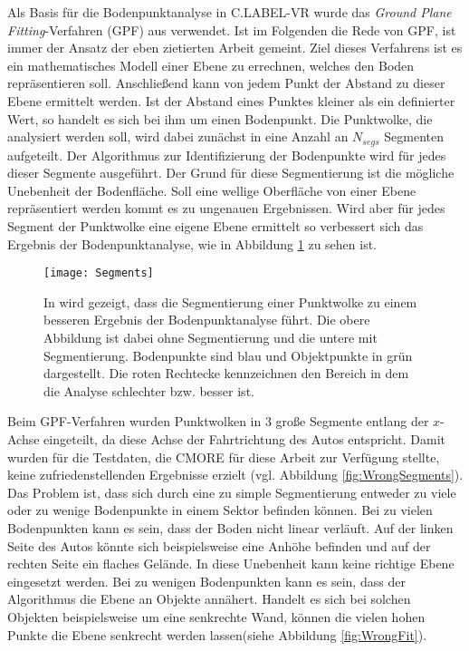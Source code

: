 Als Basis für die Bodenpunktanalyse in C.LABEL-VR wurde das \textit{Ground Plane Fitting}-Verfahren (GPF) aus \cite{bib:Segmentation1} verwendet. Ist im Folgenden die Rede von GPF, ist immer der Ansatz der eben zietierten Arbeit gemeint. Ziel dieses Verfahrens ist es ein mathematisches Modell einer Ebene zu errechnen, welches den Boden repräsentieren soll. Anschließend kann von jedem Punkt der Abstand zu dieser Ebene ermittelt werden. Ist der Abstand eines Punktes kleiner als ein definierter Wert, so handelt es sich bei ihm um einen Bodenpunkt. Die Punktwolke, die analysiert werden soll, wird dabei zunächst in eine Anzahl an $N_{segs}$ Segmenten aufgeteilt. Der Algorithmus zur Identifizierung der Bodenpunkte wird für jedes dieser Segmente ausgeführt. Der Grund für diese Segmentierung ist die mögliche Unebenheit der Bodenfläche. Soll eine wellige Oberfläche von einer Ebene repräsentiert werden kommt es zu ungenauen Ergebnissen. Wird aber für jedes Segment der Punktwolke eine eigene Ebene ermittelt so verbessert sich das Ergebnis der Bodenpunktanalyse, wie in Abbildung \ref{fig:Segments} zu sehen ist.\\

\begin{figure}%
	\centering
    \texttt{[image: Segments]}
    \caption{In \cite{bib:Segmentation1} wird gezeigt, dass die Segmentierung einer Punktwolke zu einem besseren Ergebnis der Bodenpunktanalyse führt. Die obere Abbildung ist dabei ohne Segmentierung und die untere mit Segmentierung. Bodenpunkte sind blau und Objektpunkte in grün dargestellt. Die roten Rechtecke kennzeichnen den Bereich in dem die Analyse schlechter bzw. besser ist.}
    \label{fig:Segments}
\end{figure}

Beim GPF-Verfahren wurden Punktwolken in 3 große Segmente entlang der $x$-Achse eingeteilt, da diese Achse der Fahrtrichtung des Autos entspricht. Damit wurden für die Testdaten, die CMORE für diese Arbeit zur Verfügung stellte, keine zufriedenstellenden Ergebnisse erzielt (vgl. Abbildung \ref{fig:WrongSegments}). Das Problem ist, dass sich durch eine zu simple Segmentierung entweder zu viele oder zu wenige Bodenpunkte in einem Sektor befinden können. Bei zu vielen Bodenpunkten kann es sein, dass der Boden nicht linear verläuft. Auf der linken Seite des Autos könnte sich beispielsweise eine Anhöhe befinden und auf der rechten Seite ein flaches Gelände. In diese Unebenheit kann keine richtige Ebene eingesetzt werden. Bei zu wenigen Bodenpunkten kann es sein, dass der Algorithmus die Ebene an Objekte annähert. Handelt es sich bei solchen Objekten beispielsweise um eine senkrechte Wand, können die vielen hohen Punkte die Ebene senkrecht werden lassen(siehe Abbildung \ref{fig:WrongFit}).\\


